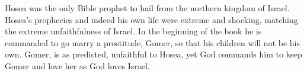 Hosea was the only Bible prophet to hail from the northern kingdom of Israel.  Hosea's prophecies and indeed his own life were extreme and shocking, matching the extreme unfaithfulness of Israel.  In the beginning of the book he is commanded to go marry a prostitude, Gomer, so that his children will not be his own.  Gomer, is as predicted, unfaithful to Hosea, yet God commands him to keep Gomer and love her as God loves Israel.  
